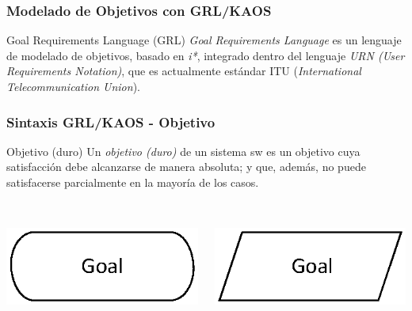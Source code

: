\documentclass[slidestop,xcolor=pst,dvips,blue]{beamer}
\begin{document}
\begin{frame}
    \frametitle{Modelado de Objetivos con GRL/KAOS}
    \begin{block}{Goal Requirements Language (GRL)}
        \emph{Goal Requirements Language} es un lenguaje de modelado de objetivos, basado en \emph{i*}, integrado dentro del lenguaje \emph{URN (User Requirements Notation)}, que es actualmente estándar ITU (\emph{International Telecommunication Union}).
    \end{block}
\end{frame}

\begin{frame}[c]
    \frametitle{Sintaxis GRL/KAOS - Objetivo}
    \begin{block}{Objetivo (duro)}
        Un \alert{\emph{objetivo (duro)}} de un sistema sw es un objetivo cuya satisfacción debe alcanzarse de manera absoluta; y que, además,
        no puede satisfacerse parcialmente en la mayoría de los casos.
        \ \\
        \ \\
        \begin{columns}[c]
            \begin{column}{0.50\linewidth}
                \centering \includegraphics[width=0.5\columnwidth,keepaspectratio=true]{images/objetivos/goal(GRL).eps}
            \end{column}
            \begin{column}{0.50\linewidth}
                \centering \includegraphics[width=0.5\columnwidth,keepaspectratio=true]{images/objetivos/goal(KAOS).eps}
            \end{column}
        \end{columns}
    \end{block}
\end{frame}
\end{document}
